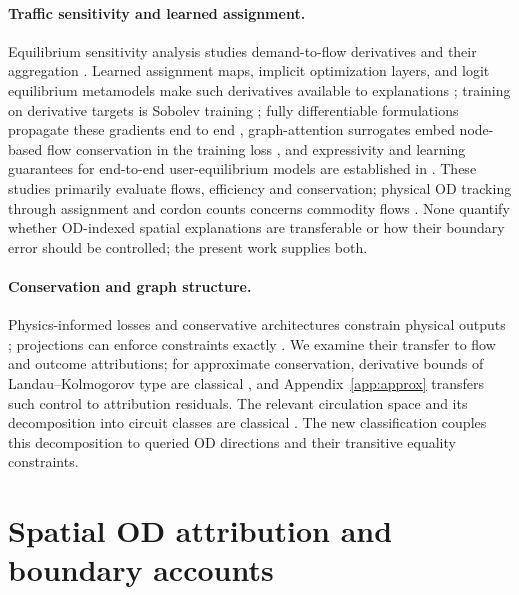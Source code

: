 \documentclass[a4paper,fleqn]{cas-sc}
\begin{document}
\paragraph{Traffic sensitivity and learned assignment.}
Equilibrium sensitivity analysis studies demand-to-flow derivatives and
their aggregation
\citep{tobin1988sensitivity,yang2005sensitivity,josefsson2007sensitivity,patriksson2003aggregated}.
Learned assignment maps, implicit optimization layers, and logit
equilibrium metamodels make such derivatives available to explanations
\citep{liu2023endtoend,amos2017optnet,lassen2025learning}; training on
derivative targets is Sobolev training
\citep{czarnecki2017sobolev,yuan2022sobolev}; fully differentiable
formulations propagate these gradients end to end
\citep{li2026differentiable,seo2026differentiable}, graph-attention
surrogates embed node-based flow conservation in the training loss
\citep{liu2024heterogeneous,liu2025multiclass}, and expressivity and
learning guarantees for end-to-end user-equilibrium models are
established in \citet{liu2025endtoend}. These studies primarily
evaluate flows, efficiency and conservation; physical OD tracking
through assignment and cordon counts concerns commodity flows
\citep{sheffi1985urban,vanzuylen1980most,bar2002origin}. None
quantify whether OD-indexed spatial explanations are transferable or
how their boundary error should be controlled; the present work
supplies both.

\paragraph{Conservation and graph structure.}
Physics-informed losses and conservative architectures constrain physical
outputs \citep{raissi2019physics,shi2021physics,richterpowell2022neural};
projections can enforce constraints exactly \citep{valente2025physics,baez2024guaranteeing}.
We examine their transfer to flow and outcome attributions; for
approximate conservation, derivative bounds of Landau--Kolmogorov type
are classical \citep{shadrin2014landau}, and
Appendix~\ref{app:approx} transfers such control to attribution
residuals. The relevant
circulation space and its decomposition into circuit classes are classical
\citep{oxley2011matroid,hopcroft1973algorithm}. The new classification couples
this decomposition to queried OD directions and their transitive equality
constraints.

\section{Spatial OD attribution and boundary accounts}\label{sec:objects}
\end{document}
